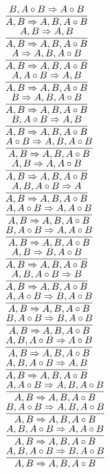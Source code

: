 \documentclass[11pt]{article}
\begin{document}
\begin{center}
\\$\infer{A, B\Rightarrow A, B, A\circ B}{B, A\circ B\Rightarrow A\circ B}$
\bigskip
\\$\infer{A, B\Rightarrow A, B, A\circ B}{A, B\Rightarrow A, B}$
\bigskip
\\$\infer{A, B\Rightarrow A, B, A\circ B}{A\Rightarrow A, B, A\circ B}$
\bigskip
\\$\infer{A, B\Rightarrow A, B, A\circ B}{A, A\circ B\Rightarrow A, B}$
\bigskip
\\$\infer{A, B\Rightarrow A, B, A\circ B}{B\Rightarrow A, B, A\circ B}$
\bigskip
\\$\infer{A, B\Rightarrow A, B, A\circ B}{B, A\circ B\Rightarrow A, B}$
\bigskip
\\$\infer{A, B\Rightarrow A, B, A\circ B}{A\circ B\Rightarrow A, B, A\circ B}$
\bigskip
\\$\infer{A, B\Rightarrow A, B, A\circ B}{A, B\Rightarrow A, A\circ B}$
\bigskip
\\$\infer{A, B\Rightarrow A, B, A\circ B}{A, B, A\circ B\Rightarrow A}$
\bigskip
\\$\infer{A, B\Rightarrow A, B, A\circ B}{A, A\circ B\Rightarrow A, A\circ B}$
\bigskip
\\$\infer{A, B\Rightarrow A, B, A\circ B}{B, A\circ B\Rightarrow A, A\circ B}$
\bigskip
\\$\infer{A, B\Rightarrow A, B, A\circ B}{A, B\Rightarrow B, A\circ B}$
\bigskip
\\$\infer{A, B\Rightarrow A, B, A\circ B}{A, B, A\circ B\Rightarrow B}$
\bigskip
\\$\infer{A, B\Rightarrow A, B, A\circ B}{A, A\circ B\Rightarrow B, A\circ B}$
\bigskip
\\$\infer{A, B\Rightarrow A, B, A\circ B}{B, A\circ B\Rightarrow B, A\circ B}$
\bigskip
\\$\infer{A, B\Rightarrow A, B, A\circ B}{A, B, A\circ B\Rightarrow A\circ B}$
\bigskip
\\$\infer{A, B\Rightarrow A, B, A\circ B}{A, B, A\circ B\Rightarrow A, B}$
\bigskip
\\$\infer{A, B\Rightarrow A, B, A\circ B}{A, A\circ B\Rightarrow A, B, A\circ B}$
\bigskip
\\$\infer{A, B\Rightarrow A, B, A\circ B}{B, A\circ B\Rightarrow A, B, A\circ B}$
\bigskip
\\$\infer{A, B\Rightarrow A, B, A\circ B}{A, B, A\circ B\Rightarrow A, A\circ B}$
\bigskip
\\$\infer{A, B\Rightarrow A, B, A\circ B}{A, B, A\circ B\Rightarrow B, A\circ B}$

\end{center}
\end{document}
